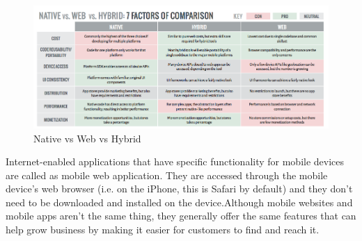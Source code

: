 \begin{figure}[!htb]	
  \includegraphics[width=\linewidth,scale = 3]{figures/MobAppTypes.png}
\caption{Native vs Web vs Hybrid}
  \label{fig: Native vs Web vs Hybrid}
\end{figure}	
			
			 Internet-enabled applications that have specific functionality for mobile devices are called as mobile web application. They are accessed through the mobile device’s web browser (i.e. on the iPhone, this is Safari by default) and they don’t need to be downloaded and installed on the device.Although mobile websites and mobile apps aren't the same thing, they generally offer the same features that can help grow business by making it easier for customers to find and reach it. 
			

